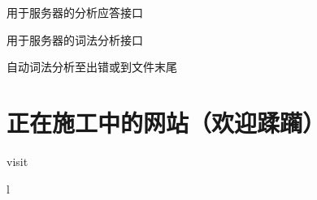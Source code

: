 \documentclass[letterpaper,10pt,english]{sphinxmanual}
\begin{document}
\begin{fulllineitems}

\begin{fulllineitems}
\label{\detokenize{grammar_analysis/gramma:grammar_analysis.utils.special_lexer.web_reply}}
用于服务器的分析应答接口

\end{fulllineitems}


\begin{fulllineitems}
\label{\detokenize{grammar_analysis/gramma:grammar_analysis.utils.special_lexer.web_word_analyze}}
用于服务器的词法分析接口

\end{fulllineitems}


\begin{fulllineitems}
\label{\detokenize{grammar_analysis/gramma:grammar_analysis.utils.special_lexer.word_analyze}}
自动词法分析至出错或到文件末尾

\end{fulllineitems}


\end{fulllineitems}



\chapter{正在施工中的网站（欢迎蹂躏）}
\label{\detokenize{index:id2}}
visit 


\renewcommand{\indexname}{Python 模块索引}
\begin{sphinxtheindex}
\def\bigletter#1{{\Large\sffamily#1}\nopagebreak\vspace{1mm}}
\bigletter{l}
\item {}
\end{sphinxtheindex}

\renewcommand{\indexname}{索引}
\printindex
\end{document}
